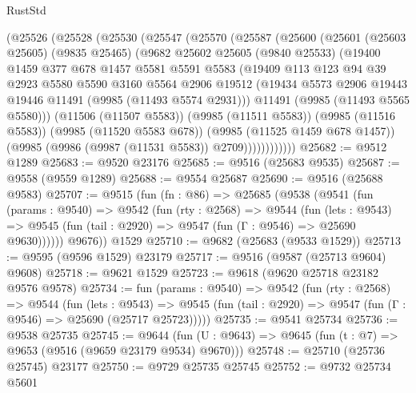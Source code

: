 \begin{lexlean}{RustStd}
\begin{coremodule}
    (@25526
      (@25528
        (@25530
          (@25547
            (@25570
              (@25587
                (@25600
                  (@25601
                    (@25603 @25605)
                    (@9835 @25465)
                    (@9682
                      @25602
                      @25605
                      (@9840 @25533)
                      (@19400
                        @1459
                        @377
                        @678
                        @1457
                        @5581
                        @5591
                        @5583
                        (@19409
                          @113
                          @123
                          @94
                          @39
                          @2923
                          @5580
                          @5590
                          @3160
                          @5564
                          @2906
                          @19512
                          (@19434 @5573 @2906 @19443 @19446 @11491 (@9985 (@11493 @5574 @2931)))
                          @11491
                          (@9985 (@11493 @5565 @5580)))
                        (@11506 (@11507 @5583))
                        (@9985 (@11511 @5583))
                        (@9985 (@11516 @5583))
                        (@9985 (@11520 @5583 @678))
                        (@9985 (@11525 @1459 @678 @1457))
                        (@9985 (@9986 (@9987 (@11531 @5583)) @2709))))))))))))
@25682 := @9512 @1289
@25683 := @9520 @23176
@25685 := @9516 (@25683 @9535)
@25687 := @9558 (@9559 @1289)
@25688 := @9554 @25687
@25690 := @9516 (@25688 @9583)
@25707 := @9515
    (fun (fn : @86) =>
    @25685
      (@9538
        (@9541
          (fun (params : @9540) =>
          @9542
            (fun (rty : @2568) =>
            @9544
              (fun (lets : @9543) =>
              @9545 (fun (tail : @2920) => @9547 (fun (Γ : @9546) => @25690 @9630))))))
        @9676))
    @1529
@25710 := @9682 (@25683 (@9533 @1529))
@25713 := @9595 (@9596 @1529) @23179
@25717 := @9516 (@9587 (@25713 @9604) @9608)
@25718 := @9621 @1529
@25723 := @9618 (@9620 @25718 @23182 @9576 @9578)
@25734 := fun (params : @9540) =>
  @9542
    (fun (rty : @2568) =>
    @9544
      (fun (lets : @9543) =>
      @9545 (fun (tail : @2920) => @9547 (fun (Γ : @9546) => @25690 (@25717 @25723)))))
@25735 := @9541 @25734
@25736 := @9538 @25735
@25745 := @9644
    (fun (U : @9643) => @9645 (fun (t : @7) => @9653 (@9516 (@9659 @23179 @9534) @9670)))
@25748 := @25710 (@25736 @25745) @23177
@25750 := @9729 @25735 @25745
@25752 := @9732 @25734 @5601

\end{coremodule}
\end{lexlean}
